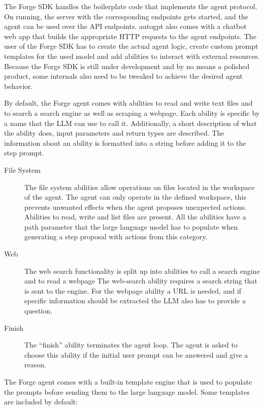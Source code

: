 \documentclass[../main.tex]{subfiles}
\begin{document}
The Forge SDK handles the boilerplate code that implements the agent protocol.
On running, the server with the corresponding endpoints gets started, and the agent can be used over the API endpoints.
\gls{autogpt} also comes with a chatbot web app that builds the appropriate HTTP requests to the agent endpoints.
The user of the Forge SDK has to create the actual agent logic, create custom prompt templates for the used model and add abilities to interact with external resources.
Because the Forge SDK is still under development and by no means a polished product, some internals also need to be tweaked to achieve the desired agent behavior.

By default, the Forge agent comes with abilities to read and write text files and to search a search engine as well as scraping a webpage.
Each ability is specific by a name that the LLM can use to call it.
Additionally, a short description of what the ability does, input parameters and return types are described.
The information about an ability is formatted into a string before adding it to the step prompt.

\begin{description}
    \item[File System] The file system abilities allow operations on files located in the workspace of the agent.
        The agent can only operate in the defined workspace, this prevents unwanted effects when the agent proposes unexpected actions.
        Abilities to read, write and list files are present.
        All the abilities have a path parameter that the large language model has to populate when generating a step proposal with actions from this category.
    \item[Web] The web search functionality is split up into abilities to call a search engine and to read a webpage
        The web-search ability requires a search string that is sent to the engine.
        For the webpage ability a URL is needed, and if specific information should be extracted the LLM also has to provide a question.
    \item[Finish] The “finish” ability terminates the agent loop.
        The agent is asked to choose this ability if the initial user prompt can be answered and give a reason.
\end{description}

The Forge agent comes with a built-in template engine that is used
to populate the prompts before sending them to the large language model.
Some templates are included by default:
\end{document}
